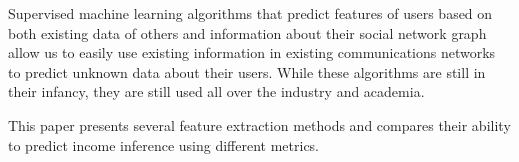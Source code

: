 Supervised machine learning algorithms that predict features of users based on both existing data of others and information about their social network graph allow us to easily use existing information in existing communications networks to predict unknown data about their users. While these algorithms are still in their infancy, they are still used all over the industry and academia.

This paper presents several feature extraction methods and compares their ability to predict income inference using different metrics.

